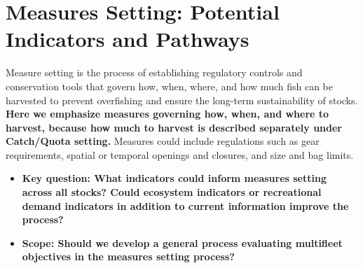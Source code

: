 \documentclass[
]{article}
\author{}
\date{\vspace{-2.5em}}
\providecommand{\tightlist}{%
  \setlength{\itemsep}{0pt}\setlength{\parskip}{0pt}}
\begin{document}
\vspace{-1cm}

\section{Measures Setting: Potential Indicators and
Pathways}\label{measures-setting-potential-indicators-and-pathways}

\begin{noteblock}
Measure setting is the process of establishing regulatory controls and
conservation tools that govern how, when, where, and how much fish can
be harvested to prevent overfishing and ensure the long-term
sustainability of stocks. \textbf{Here we emphasize measures governing
how, when, and where to harvest, because how much to harvest is
described separately under Catch/Quota setting.} Measures could include
regulations such as gear requirements, spatial or temporal openings and
closures, and size and bag limits.

\end{noteblock}

\begin{itemize}
\tightlist
\item
  \textbf{Key question: What indicators could inform measures setting
  across all stocks? Could ecosystem indicators or recreational demand
  indicators in addition to current information improve the process?}
\item
  \textbf{Scope: Should we develop a general process evaluating
  multifleet objectives in the measures setting process?}
\end{itemize}
\end{document}
